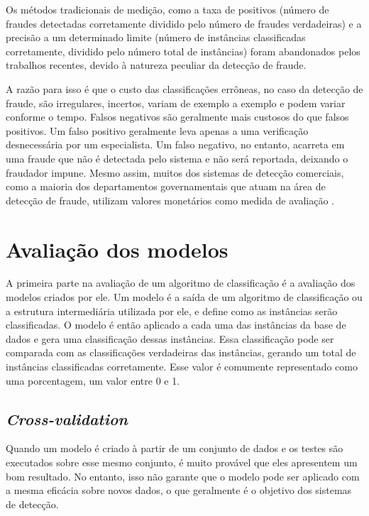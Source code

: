 Os métodos tradicionais de medição, como a taxa de positivos (número de fraudes detectadas corretamente dividido pelo número de fraudes verdadeiras) e a precisão a um determinado limite (número de instâncias classificadas corretamente, dividido pelo número total de instâncias) foram abandonados pelos trabalhos recentes, devido à natureza peculiar da detecção de fraude.

A razão para isso é que o custo das classificações errôneas, no caso da detecção de fraude, são irregulares, incertos, variam de exemplo a exemplo e podem variar conforme o tempo. Falsos negativos são geralmente mais custosos do que falsos positivos. Um falso positivo geralmente leva apenas a uma verificação desnecessária por um especialista. Um falso negativo, no entanto, acarreta em uma fraude que não é detectada pelo sistema e não será reportada, deixando o fraudador impune. Mesmo assim, muitos dos sistemas de detecção comerciais, como a maioria dos departamentos governamentais que atuam na área de detecção de fraude, utilizam valores monetários como medida de avaliação \cite{Phua2010}.

\section{Avaliação dos modelos}

A primeira parte na avaliação de um algoritmo de classificação é a avaliação dos modelos criados por ele. Um modelo é a saída de um algoritmo de classificação ou a estrutura intermediária utilizada por ele, e define como as instâncias serão classificadas. O modelo é então aplicado a cada uma das instâncias da base de dados e gera uma classificação dessas instâncias. Essa classificação pode ser comparada com as classificações verdadeiras das instâncias, gerando um total de instâncias classificadas corretamente. Esse valor é comumente representado como uma porcentagem, um valor entre 0 e 1.

\subsection{\emph{Cross-validation}}

Quando um modelo é criado à partir de um conjunto de dados e os testes são executados sobre esse mesmo conjunto, é muito provável que eles apresentem um bom resultado. No entanto, isso não garante que o modelo pode ser aplicado com a mesma eficácia sobre novos dados, o que geralmente é o objetivo dos sistemas de detecção.

